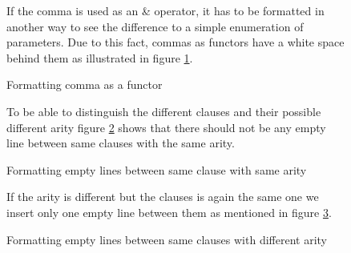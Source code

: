 \documentclass{article}
\begin{document}
\begin{figure}[h]
If the comma is used as an \& operator, it has to be formatted in another way to see the difference to a simple enumeration of parameters. Due to this fact, commas as functors have a white space behind them as illustrated in figure \ref{lst:comma}.\\

\begin{minipage}{.5\textwidth}

\end{minipage}
\hfill
\begin{minipage}{.5\textwidth}

\end{minipage}

\caption{Formatting comma as a functor}
\label{lst:comma}
\end{figure}


\begin{figure}[h]
To be able to distinguish the different clauses and their possible different arity figure \ref{lst:sameclause_arity} shows that there should not be any empty line between same clauses with the same arity.\\

\begin{minipage}{.5\textwidth}

\end{minipage}
\hfill
\begin{minipage}{.5\textwidth}

\end{minipage}

\caption{Formatting empty lines between same clause with same arity}
\label{lst:sameclause_arity}
\end{figure}

\begin{figure}[h]If the arity is different but the clauses is again the same one we insert only one empty line between them as mentioned in figure \ref{lst:sameclauses}.\\

\begin{minipage}{.5\textwidth}

\end{minipage}
\hfill
\begin{minipage}{.5\textwidth}

\end{minipage}

\caption{Formatting empty lines between same clauses with different arity}
\label{lst:sameclauses}
\end{figure}
\end{document}

